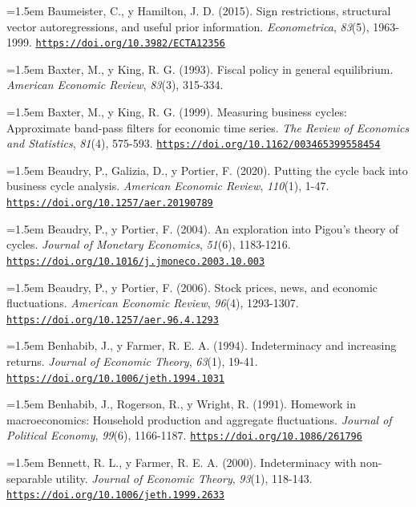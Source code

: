 \documentclass[10pt,a4paper]{article}
\begin{document}
\noindent\hangindent=1.5em Baumeister, C., y Hamilton, J. D. (2015). Sign restrictions, structural vector autoregressions, and useful prior information. \textit{Econometrica}, \textit{83}(5), 1963-1999. \href{https://doi.org/10.3982/ECTA12356}{\nolinkurl{https://doi.org/10.3982/ECTA12356}}

\noindent\hangindent=1.5em Baxter, M., y King, R. G. (1993). Fiscal policy in general equilibrium. \textit{American Economic Review}, \textit{83}(3), 315-334.

\noindent\hangindent=1.5em Baxter, M., y King, R. G. (1999). Measuring business cycles: Approximate band-pass filters for economic time series. \textit{The Review of Economics and Statistics}, \textit{81}(4), 575-593. \href{https://doi.org/10.1162/003465399558454}{\nolinkurl{https://doi.org/10.1162/003465399558454}}

\noindent\hangindent=1.5em Beaudry, P., Galizia, D., y Portier, F. (2020). Putting the cycle back into business cycle analysis. \textit{American Economic Review}, \textit{110}(1), 1-47. \href{https://doi.org/10.1257/aer.20190789}{\nolinkurl{https://doi.org/10.1257/aer.20190789}}

\noindent\hangindent=1.5em Beaudry, P., y Portier, F. (2004). An exploration into Pigou's theory of cycles. \textit{Journal of Monetary Economics}, \textit{51}(6), 1183-1216. \href{https://doi.org/10.1016/j.jmoneco.2003.10.003}{\nolinkurl{https://doi.org/10.1016/j.jmoneco.2003.10.003}}

\noindent\hangindent=1.5em Beaudry, P., y Portier, F. (2006). Stock prices, news, and economic fluctuations. \textit{American Economic Review}, \textit{96}(4), 1293-1307. \href{https://doi.org/10.1257/aer.96.4.1293}{\nolinkurl{https://doi.org/10.1257/aer.96.4.1293}}

\noindent\hangindent=1.5em Benhabib, J., y Farmer, R. E. A. (1994). Indeterminacy and increasing returns. \textit{Journal of Economic Theory}, \textit{63}(1), 19-41. \href{https://doi.org/10.1006/jeth.1994.1031}{\nolinkurl{https://doi.org/10.1006/jeth.1994.1031}}

\noindent\hangindent=1.5em Benhabib, J., Rogerson, R., y Wright, R. (1991). Homework in macroeconomics: Household production and aggregate fluctuations. \textit{Journal of Political Economy}, \textit{99}(6), 1166-1187. \href{https://doi.org/10.1086/261796}{\nolinkurl{https://doi.org/10.1086/261796}}

\noindent\hangindent=1.5em Bennett, R. L., y Farmer, R. E. A. (2000). Indeterminacy with non-separable utility. \textit{Journal of Economic Theory}, \textit{93}(1), 118-143. \href{https://doi.org/10.1006/jeth.1999.2633}{\nolinkurl{https://doi.org/10.1006/jeth.1999.2633}}
\end{document}
